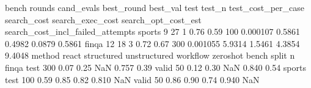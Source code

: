  bench  rounds  cand_evals  best_round  best_val  test  test_n  test_cost_per_case  search_cost  search_exec_cost  search_opt_cost_est  search_cost_incl_failed_attempts
sports       9          27           1      0.76  0.59     100            0.000107       0.5861            0.4982               0.0879                            0.5861
 finqa      12          18           3      0.72  0.67     300            0.001055       5.9314            1.5461               4.3854                            9.4048
method            react  structured  unstructured  workflow  zeroshot
bench  split n                                                       
finqa  test  300   0.07        0.25           NaN     0.757      0.39
       valid 50    0.12        0.30           NaN     0.840      0.54
sports test  100   0.59        0.85          0.82     0.810       NaN
       valid 50    0.86        0.90          0.74     0.940       NaN
